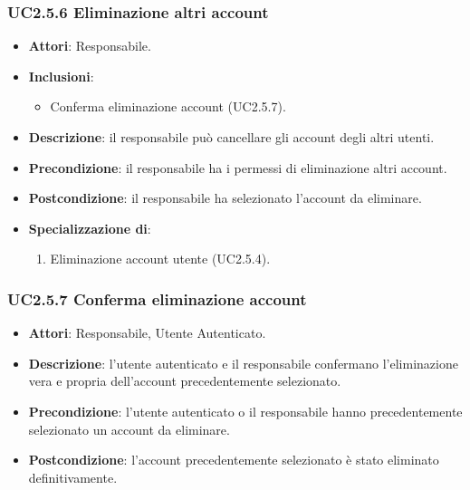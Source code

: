 \subsubsection{UC2.5.6 Eliminazione altri account}
\begin{itemize}
\item \textbf{Attori}: Responsabile.
\item \textbf{Inclusioni}:
\begin{itemize}
\item Conferma eliminazione account (UC2.5.7).
\end{itemize}
\item \textbf{Descrizione}: il responsabile può cancellare gli account degli altri utenti.
\item \textbf{Precondizione}: il responsabile ha i permessi di eliminazione altri account.
\item \textbf{Postcondizione}: il responsabile ha selezionato l'account da eliminare.
\item \textbf{Specializzazione di}:
\begin{enumerate}
\item Eliminazione account utente (UC2.5.4).
\end{enumerate}
\end{itemize}
\subsubsection{UC2.5.7 Conferma eliminazione account}
\begin{itemize}
\item \textbf{Attori}: Responsabile, Utente Autenticato.
\item \textbf{Descrizione}: l'utente autenticato e il responsabile confermano l'eliminazione vera e propria dell'account precedentemente selezionato.
\item \textbf{Precondizione}: l'utente autenticato o il responsabile hanno precedentemente selezionato un account da eliminare.
\item \textbf{Postcondizione}: l'account precedentemente selezionato è stato eliminato definitivamente.
\end{itemize}
